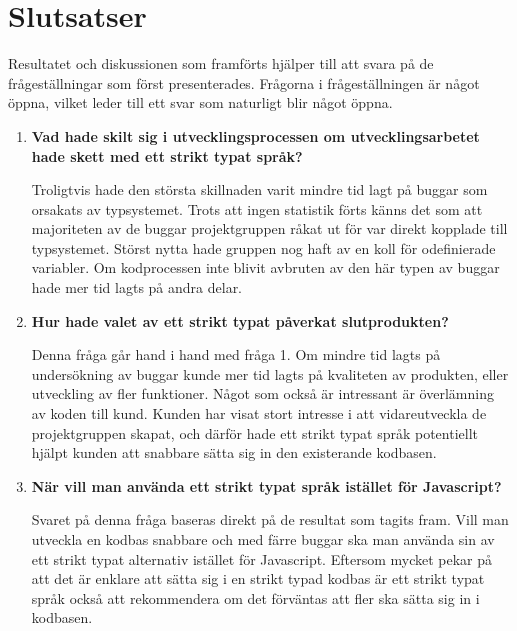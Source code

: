 \section{Slutsatser}
\label{sec:alexander-conclusion}

Resultatet och diskussionen som framförts hjälper till att svara på de frågeställningar som först presenterades.  Frågorna i frågeställningen är något öppna, vilket leder till ett svar som naturligt blir något öppna.

\begin{enumerate}
    \item \textbf{Vad hade skilt sig i utvecklingsprocessen om utvecklingsarbetet hade skett med ett strikt typat språk?}

    Troligtvis hade den största skillnaden varit mindre tid lagt på buggar som orsakats av typsystemet. Trots att ingen statistik förts känns det som att majoriteten av de buggar projektgruppen råkat ut för var direkt kopplade till typsystemet. Störst nytta hade gruppen nog haft av en koll för odefinierade variabler. Om kodprocessen inte blivit avbruten av den här typen av buggar hade mer tid lagts på andra delar.

    \item \textbf{Hur hade valet av ett strikt typat påverkat slutprodukten?}

    Denna fråga går hand i hand med fråga 1. Om mindre tid lagts på undersökning av buggar kunde mer tid lagts på kvaliteten av produkten, eller utveckling av fler funktioner. Något som också är intressant är överlämning av koden till kund. Kunden har visat stort intresse i att vidareutveckla de projektgruppen skapat, och därför hade ett strikt typat språk potentiellt hjälpt kunden att snabbare sätta sig in den existerande kodbasen.

    \item \textbf{När vill man använda ett strikt typat språk istället för Javascript?}
    
    Svaret på denna fråga baseras direkt på de resultat som tagits fram. Vill man utveckla en kodbas snabbare och med färre buggar ska man använda sin av ett strikt typat alternativ istället för Javascript. Eftersom mycket pekar på att det är enklare att sätta sig i en strikt typad kodbas är ett strikt typat språk också att rekommendera om det förväntas att fler ska sätta sig in i kodbasen.
\end{enumerate}